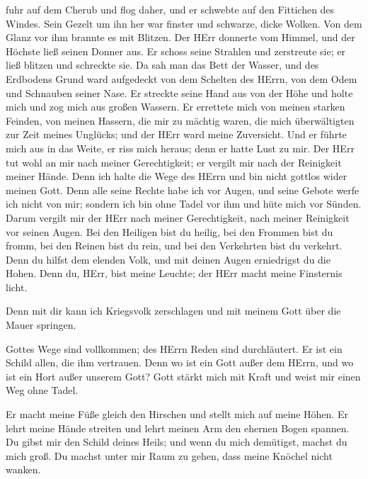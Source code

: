 fuhr auf dem Cherub und flog daher, und er schwebte auf den Fittichen
des Windes.  Sein Gezelt um ihn her war finster und
schwarze, dicke Wolken.  Von dem Glanz vor ihm brannte es
mit Blitzen.  Der HErr donnerte vom Himmel, und der Höchste
ließ seinen Donner aus.  Er schoss seine Strahlen und
zerstreute sie; er ließ blitzen und schreckte sie.  Da sah
man das Bett der Wasser, und des Erdbodens Grund ward aufgedeckt von dem
Schelten des HErrn, von dem Odem und Schnauben seiner Nase.
 Er streckte seine Hand aus von der Höhe und holte mich und
zog mich aus großen Wassern.  Er errettete mich von meinen
starken Feinden, von meinen Hassern, die mir zu mächtig waren,
 die mich überwältigten zur Zeit meines Unglücks; und der
HErr ward meine Zuversicht.  Und er führte mich aus in das
Weite, er riss mich heraus; denn er hatte Lust zu mir.  Der
HErr tut wohl an mir nach meiner Gerechtigkeit; er vergilt mir nach der
Reinigkeit meiner Hände.  Denn ich halte die Wege des HErrn
und bin nicht gottlos wider meinen Gott.  Denn alle seine
Rechte habe ich vor Augen, und seine Gebote werfe ich nicht von mir;
 sondern ich bin ohne Tadel vor ihm und hüte mich vor
Sünden.  Darum vergilt mir der HErr nach meiner
Gerechtigkeit, nach meiner Reinigkeit vor seinen Augen. 
Bei den Heiligen bist du heilig, bei den Frommen bist du fromm,
 bei den Reinen bist du rein, und bei den Verkehrten bist
du verkehrt.  Denn du hilfst dem elenden Volk, und mit
deinen Augen erniedrigst du die Hohen.  Denn du, HErr, bist
meine Leuchte; der HErr macht meine Finsternis licht.

 Denn mit dir kann ich Kriegsvolk zerschlagen und mit
meinem Gott über die Mauer springen.

 Gottes Wege sind vollkommen; des HErrn Reden sind
durchläutert. Er ist ein Schild allen, die ihm vertrauen. 
Denn wo ist ein Gott außer dem HErrn, und wo ist ein Hort außer unserem
Gott?  Gott stärkt mich mit Kraft und weist mir einen Weg
ohne Tadel.

 Er macht meine Füße gleich den Hirschen und stellt mich
auf meine Höhen.  Er lehrt meine Hände streiten und lehrt
meinen Arm den ehernen Bogen spannen.  Du gibst mir den
Schild deines Heils; und wenn du mich demütigst, machst du mich groß.
 Du machst unter mir Raum zu gehen, dass meine Knöchel
nicht wanken.

